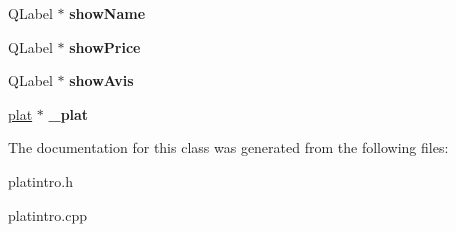 \begin{DoxyCompactItemize}
\item 
Q\+Label $\ast$ {\bfseries show\+Name}\hypertarget{classplat_intro_a78548c02a78ec016f1c05dbf3d64aed5}{}\label{classplat_intro_a78548c02a78ec016f1c05dbf3d64aed5}

\item 
Q\+Label $\ast$ {\bfseries show\+Price}\hypertarget{classplat_intro_a37668428ca385c00f1fc498399427a17}{}\label{classplat_intro_a37668428ca385c00f1fc498399427a17}

\item 
Q\+Label $\ast$ {\bfseries show\+Avis}\hypertarget{classplat_intro_a30d5e086a48fa401d3d30cbda21e927f}{}\label{classplat_intro_a30d5e086a48fa401d3d30cbda21e927f}

\item 
\hyperlink{classplat}{plat} $\ast$ {\bfseries \+\_\+plat}\hypertarget{classplat_intro_a32bb65047ebeb69a2c9fe80d3fc87147}{}\label{classplat_intro_a32bb65047ebeb69a2c9fe80d3fc87147}

\end{DoxyCompactItemize}


The documentation for this class was generated from the following files\+:\begin{DoxyCompactItemize}
\item 
platintro.\+h\item 
platintro.\+cpp\end{DoxyCompactItemize}
